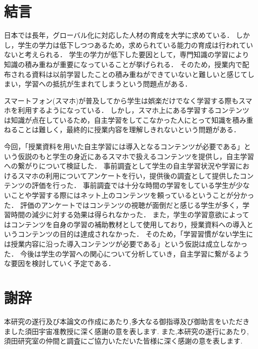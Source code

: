 \documentclass[12pt,a4j,titlepage]{ltjsarticle}
\begin{document}
\clearpage

\section{結言}
日本では長年，グローバル化に対応した人材の育成を大学に求めている\cite{monka2012}．
しかし，学生の学力は低下しつつあるため，求められている能力の育成は行われていないと考えられる．
学生の学力が低下した要因として，専門知識の学習により知識の積み重ねが重要になっていることが挙げられる．
そのため，授業内で配布される資料は以前学習したことの積み重ねができていないと難しいと感じてしまい，学習への抵抗が生まれてしまうという問題点がある．

スマートフォン(スマホ)が普及してから学生は娯楽だけでなく学習する際もスマホを利用するようになっている．
しかし，スマホ上にある学習するコンテンツは知識が点在しているため，自主学習をしてこなかった人にとって知識を積み重ねることは難しく，最終的に授業内容を理解しきれないという問題がある．

今回，「授業資料を用いた自主学習には導入となるコンテンツが必要である」という仮説のもと学生の身近にあるスマホで扱えるコンテンツを提供し，自主学習への繋がりについて検証した．
事前調査として学生の自主学習状況や学習におけるスマホの利用についてアンケートを行い，提供後の調査として提供したコンテンツの評価を行った．
事前調査では十分な時間の学習をしている学生が少ないことや学習する際にはネット上のコンテンツを頼っているということが分かった．
評価のアンケートではコンテンツの視聴が面倒だと感じる学生が多く，学習時間の減少に対する効果は得られなかった．
また，学生の学習意欲によってはコンテンツを自身の学習の補助教材として使用しており，授業資料への導入というコンテンツの目的は達成されなかった．
そのため，「学習習慣がない学生には授業内容に沿った導入コンテンツが必要である」という仮説は成立しなかった．
今後は学生の学習への関心について分析していき，自主学習に繋がるような要因を検討していく予定である．

\clearpage

\section*{謝辞}
本研究の遂行及び本論文の作成にあたり,多大なる御指導及び御助言をいただきました須田宇宙准教授に深く感謝の意を表します.
また,本研究の遂行にあたり,須田研究室の仲間と調査にご協力いただいた皆様に深く感謝の意を表します.

\clearpage



\end{document}
